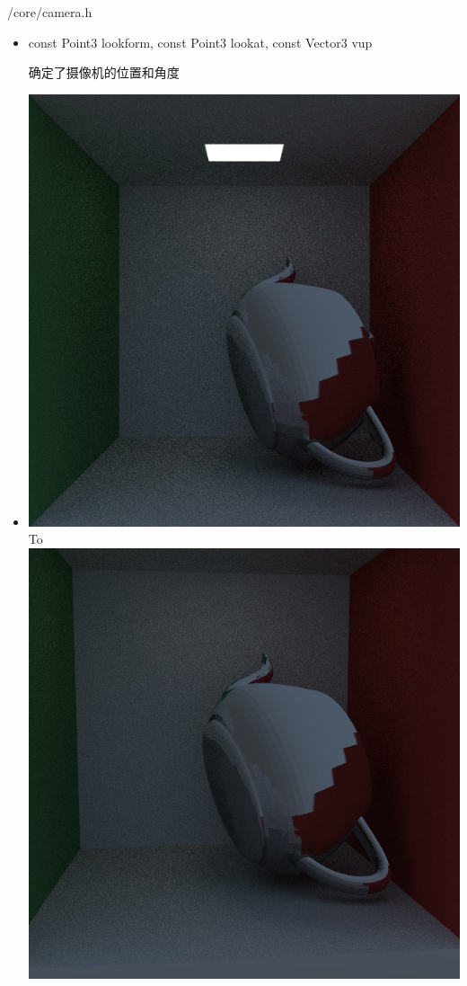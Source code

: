\documentclass{beamer}
\begin{document}
\begin{frame} {/core/camera.h}
\begin{itemize}
\item 
\begin{semiverbatim} const Point3 lookform, \newline const Point3 lookat, \newline const Vector3 vup \end{semiverbatim}
确定了摄像机的位置和角度
\item \includegraphics[scale=0.2]{cornellbox_teapot_rotate} \normalsize To 
\includegraphics[scale=0.2]{cornellbox_teapot_camera_move}
\end{itemize}
\end{frame}
\end{document}
